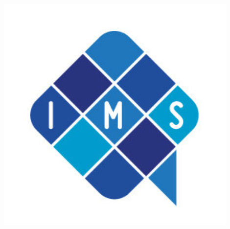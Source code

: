 \documentclass[a0,landscape]{a0poster}
\begin{document}
%
\begin{minipage}[b]{0.20\linewidth}
	\centering\includegraphics[width=12cm]{Bilder/logo_IMS_klein.jpg} %
\end{minipage}

\vspace{1cm} %

\end{document}

